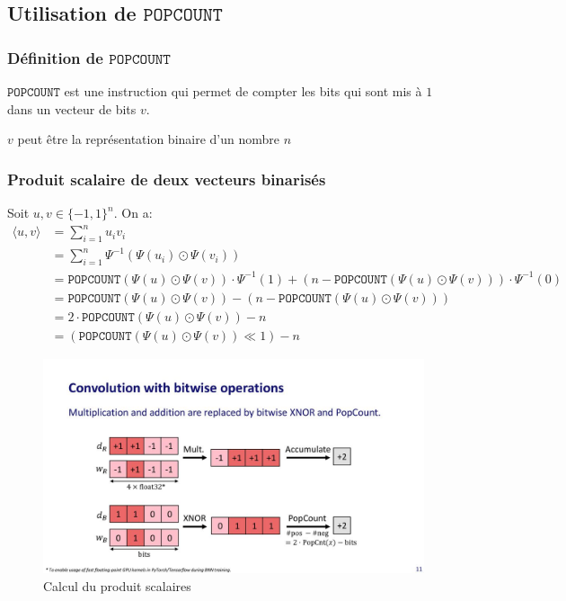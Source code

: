 \subsection{Utilisation de $\mathtt{POPCOUNT}$}
	\subsubsection{Définition de $\mathtt{POPCOUNT}$}
	$\mathtt{POPCOUNT}$ est une instruction qui permet de compter les bits qui sont mis à $1$ dans un vecteur de bits $v.$
	\begin{remark}
		$v$ peut être la représentation binaire d'un nombre $n$
	\end{remark} 
	\subsubsection{Produit scalaire de deux vecteurs binarisés}
	Soit $u,v\in\{-1,1\}^n.$ On a:
	\begin{align*}
		\langle u,v \rangle &=\sum_{i=1}^n u_iv_i \\ 
		&=  \sum_{i=1}^n \Psi^{-1}(\Psi(u_i)\odot\Psi (v_i)) \\
		&= \mathtt{POPCOUNT}(\Psi(u)\odot \Psi(v)) \cdot \Psi^{-1}(1) + \left(n-\mathtt{POPCOUNT}(\Psi(u)\odot \Psi(v))\right)\cdot \Psi^{-1}(0) \\
		&= \mathtt{POPCOUNT}(\Psi(u)\odot \Psi(v))-\left(n-\mathtt{POPCOUNT}\left(\Psi(u)\odot \Psi(v)\right)\right) \\
		&= 2\cdot \mathtt{POPCOUNT}(\Psi(u)\odot \Psi(v)) - n \\
		&= \left(\mathtt{POPCOUNT}\left(\Psi(u)\odot \Psi(v)\right) \ll 1 \right) - n
	\end{align*}
	\begin{figure}[h!]
		\centering
		\includegraphics[width=.9\textwidth]{Figures/POPCOUNT.jpg}
		\caption{Calcul du produit scalaires}
		\label{fig:POPCOUNT}
	\end{figure}
\pagebreak
